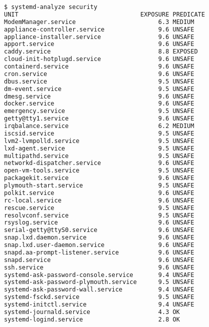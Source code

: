 \begin{lstlisting}[language=bash, deletekeywords={local}, numbers=none, caption={Output of \texttt{systemd-analyze security}}]
$ systemd-analyze security
UNIT                                  EXPOSURE PREDICATE 
ModemManager.service                       6.3 MEDIUM    
appliance-controller.service               9.6 UNSAFE    
appliance-installer.service                9.6 UNSAFE    
apport.service                             9.6 UNSAFE    
caddy.service                              8.8 EXPOSED   
cloud-init-hotplugd.service                9.6 UNSAFE    
containerd.service                         9.6 UNSAFE    
cron.service                               9.6 UNSAFE    
dbus.service                               9.5 UNSAFE    
dm-event.service                           9.5 UNSAFE    
dmesg.service                              9.6 UNSAFE    
docker.service                             9.6 UNSAFE    
emergency.service                          9.5 UNSAFE    
getty@tty1.service                         9.6 UNSAFE    
irqbalance.service                         6.2 MEDIUM    
iscsid.service                             9.5 UNSAFE    
lvm2-lvmpolld.service                      9.5 UNSAFE    
lxd-agent.service                          9.5 UNSAFE    
multipathd.service                         9.5 UNSAFE    
networkd-dispatcher.service                9.6 UNSAFE    
open-vm-tools.service                      9.5 UNSAFE    
packagekit.service                         9.6 UNSAFE    
plymouth-start.service                     9.5 UNSAFE    
polkit.service                             9.6 UNSAFE    
rc-local.service                           9.6 UNSAFE    
rescue.service                             9.5 UNSAFE    
resolvconf.service                         9.5 UNSAFE    
rsyslog.service                            9.6 UNSAFE    
serial-getty@ttyS0.service                 9.6 UNSAFE    
snap.lxd.daemon.service                    9.6 UNSAFE    
snap.lxd.user-daemon.service               9.6 UNSAFE    
snapd.aa-prompt-listener.service           9.6 UNSAFE    
snapd.service                              9.6 UNSAFE    
ssh.service                                9.6 UNSAFE    
systemd-ask-password-console.service       9.4 UNSAFE    
systemd-ask-password-plymouth.service      9.5 UNSAFE    
systemd-ask-password-wall.service          9.4 UNSAFE    
systemd-fsckd.service                      9.5 UNSAFE    
systemd-initctl.service                    9.4 UNSAFE    
systemd-journald.service                   4.3 OK        
systemd-logind.service                     2.8 OK        

\end{lstlisting}
